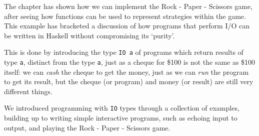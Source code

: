 \begin{summary}

The chapter has shown how we can implement the Rock - Paper - Scissors game, after seeing how functions can be used to represent strategies within the game. This example has bracketed a discussion of how programs that perform I/O can be written in Haskell without compromising its `purity'. 

This is done by introducing the type \texttt{IO a} of programs which return results of type \texttt{a}, distinct from the type \texttt{a}, just as a cheque for \${}100 is not the same as \${}100 itself: we can \emph{cash} the cheque to get the money, just as we can \emph{run} the program to get its result, but the cheque (or program) and money (or result) are still very different things.

We introduced programming with \texttt{IO} types through a collection of examples, building up to writing simple interactive programs, such as echoing input to output, and playing the Rock - Paper - Scissors game.
\end{summary} 
